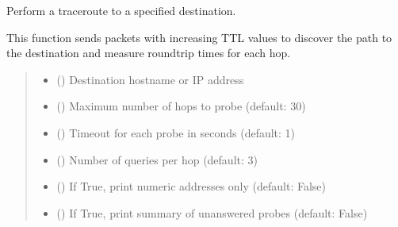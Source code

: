 \documentclass[letterpaper,10pt,english]{sphinxmanual}
\begin{document}
\begin{fulllineitems}
\label{\detokenize{traceroute:traceroute.traceroute}}
\pysigstartsignatures
\pysiglinewithargsret
{}
{\sphinxparamcomma {}\sphinxparamcomma {}\sphinxparamcomma {}\sphinxparamcomma {}\sphinxparamcomma {}}
{}
\pysigstopsignatures
\sphinxAtStartPar
Perform a traceroute to a specified destination.

\sphinxAtStartPar
This function sends packets with increasing TTL values to discover the path
to the destination and measure round\sphinxhyphen{}trip times for each hop.
\begin{quote}\begin{description}
\begin{itemize}
\item {} 
\sphinxAtStartPar
{} () \textendash{} Destination hostname or IP address

\item {} 
\sphinxAtStartPar
{} () \textendash{} Maximum number of hops to probe (default: 30)

\item {} 
\sphinxAtStartPar
{} () \textendash{} Timeout for each probe in seconds (default: 1)

\item {} 
\sphinxAtStartPar
{} () \textendash{} Number of queries per hop (default: 3)

\item {} 
\sphinxAtStartPar
{} () \textendash{} If True, print numeric addresses only (default: False)

\item {} 
\sphinxAtStartPar
{} () \textendash{} If True, print summary of unanswered probes (default: False)

\end{itemize}

\end{description}\end{quote}

\end{fulllineitems}
\end{document}
